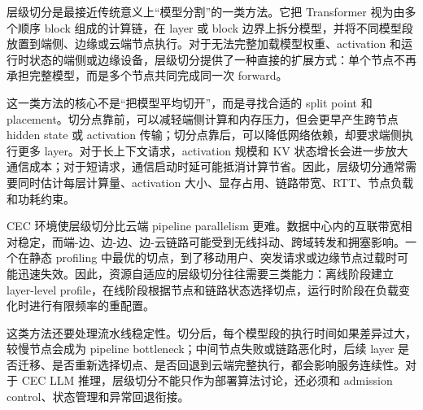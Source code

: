 \documentclass[a4paper,twocolumn,10pt]{ctexart}
\begin{document}
层级切分是最接近传统意义上“模型分割”的一类方法。它把 Transformer 视为由多个顺序 block 组成的计算链，在 layer 或 block 边界上拆分模型，并将不同模型段放置到端侧、边缘或云端节点执行。对于无法完整加载模型权重、activation 和运行时状态的端侧或边缘设备，层级切分提供了一种直接的扩展方式：单个节点不再承担完整模型，而是多个节点共同完成同一次 forward。


这一类方法的核心不是“把模型平均切开”，而是寻找合适的 split point 和 placement。切分点靠前，可以减轻端侧计算和内存压力，但会更早产生跨节点 hidden state 或 activation 传输；切分点靠后，可以降低网络依赖，却要求端侧执行更多 layer。对于长上下文请求，activation 规模和 KV 状态增长会进一步放大通信成本；对于短请求，通信启动时延可能抵消计算节省。因此，层级切分通常需要同时估计每层计算量、activation 大小、显存占用、链路带宽、RTT、节点负载和功耗约束。


CEC 环境使层级切分比云端 pipeline parallelism 更难。数据中心内的互联带宽相对稳定，而端-边、边-边、边-云链路可能受到无线抖动、跨域转发和拥塞影响。一个在静态 profiling 中最优的切点，到了移动用户、突发请求或边缘节点过载时可能迅速失效。因此，资源自适应的层级切分往往需要三类能力：离线阶段建立 layer-level profile，在线阶段根据节点和链路状态选择切点，运行时阶段在负载变化时进行有限频率的重配置。


这类方法还要处理流水线稳定性。切分后，每个模型段的执行时间如果差异过大，较慢节点会成为 pipeline bottleneck；中间节点失败或链路恶化时，后续 layer 是否迁移、是否重新选择切点、是否回退到云端完整执行，都会影响服务连续性。对于 CEC LLM 推理，层级切分不能只作为部署算法讨论，还必须和 admission control、状态管理和异常回退衔接。
\end{document}
